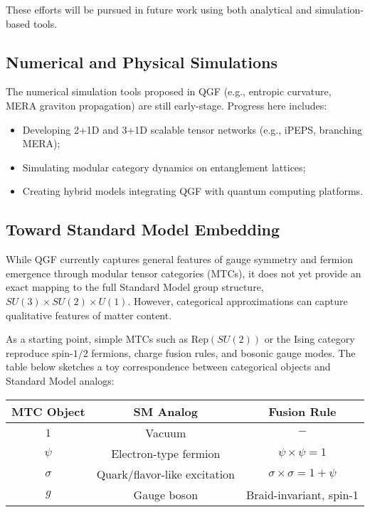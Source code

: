 \documentclass[11pt]{article}
\def\frac#1#2{#1/#2}
\begin{document}
These efforts will be pursued in future work using both analytical and simulation-based tools.


\subsection{Numerical and Physical Simulations}

The numerical simulation tools proposed in QGF (e.g., entropic curvature, MERA graviton propagation) are still early-stage. Progress here includes:
\begin{itemize}
    \item Developing 2+1D and 3+1D scalable tensor networks (e.g., iPEPS, branching MERA);
    \item Simulating modular category dynamics on entanglement lattices;
    \item Creating hybrid models integrating QGF with quantum computing platforms.
\end{itemize}
\subsection*{Toward Standard Model Embedding}

While QGF currently captures general features of gauge symmetry and fermion emergence through modular tensor categories (MTCs), it does not yet provide an exact mapping to the full Standard Model group structure, $SU(3) \times SU(2) \times U(1)$. However, categorical approximations can capture qualitative features of matter content.

As a starting point, simple MTCs such as $\text{Rep}(SU(2))$ or the Ising category reproduce spin-$\frac{1}{2}$ fermions, charge fusion rules, and bosonic gauge modes. The table below sketches a toy correspondence between categorical objects and Standard Model analogs:

\begin{center}
\begin{tabular}{c|c|c}
\textbf{MTC Object} & \textbf{SM Analog} & \textbf{Fusion Rule} \\
\hline
$1$ & Vacuum & $-$ \\
$\psi$ & Electron-type fermion & $\psi \times \psi = 1$ \\
$\sigma$ & Quark/flavor-like excitation & $\sigma \times \sigma = 1 + \psi$ \\
$g$ & Gauge boson & Braid-invariant, spin-1 \\
\end{tabular}
\end{center}
\end{document}

